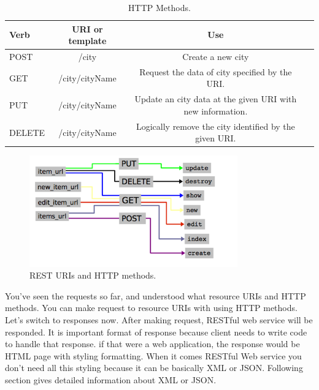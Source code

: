 \begin{table}[!htb]
  \renewcommand{\arraystretch}{1.2} %
  \centering
  \begin{tabular}{lccc}
    \toprule
    Verb           & URI or template & Use  \\
    \midrule
    POST           & /city & Create a new city\\
    GET            & /city/{cityName} & Request the data of city specified by the URI.\\
    PUT            & /city/{cityName} & Update an city data at the given URI with new information.\\
    DELETE         & /city/{cityName} & Logically remove the city identified by the given URI.\\
    \bottomrule
  \end{tabular}
  \caption[HTTP Methods.]{HTTP Methods.}
  \label{tab:aeroCoeff}
\end{table}

\begin{figure}[!htb]
  \centering
  \includegraphics[width=0.8\textwidth]{Figures/rest.png}
  \caption[REST URIs and HTTP methods.]{REST URIs and HTTP methods.}
  \label{fig:rest}
\end{figure}

You've seen the requests so far, and understood what resource URIs and HTTP methods. You can make request to resource URIs with using HTTP methods. Let's switch to responses now. After making request, RESTful web service will be responded. It is important format of response because client needs to write code to handle that response. if that were a web application, the response would be HTML page with styling formatting. When it comes RESTful Web service you don't need all this styling because it can be basically XML or JSON. Following section gives detailed information about XML or JSON.
